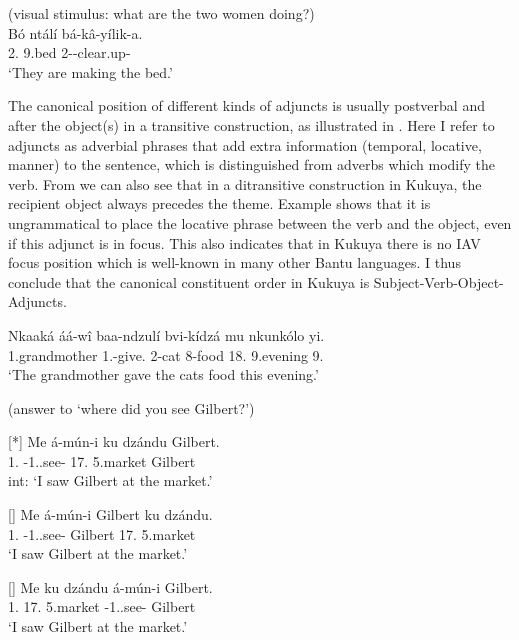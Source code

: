 \documentclass[output=paper,colorlinks,citecolor=brown,
]{langscibook}
\begin{document}
\begin{exe}
\ex
\label{2}
(visual stimulus: what are the two women doing?)\\
\gll
Bó ntálí bá-kâ-yílik-a.\\
2.\Pro{} 9.bed 2\Sm{}-\Prs{}-clear.up-\Fv{}\\
\trans ‘They are making the bed.’


\end{exe}
The canonical position of different kinds of adjuncts is usually postverbal and after the object(s) in a transitive construction, as illustrated in . Here I refer to adjuncts as adverbial phrases that add extra information (temporal, locative, manner) to the sentence, which is distinguished from adverbs which modify the verb. From  we can also see that in a ditransitive construction in Kukuya, the recipient object always precedes the theme. Example  shows that it is ungrammatical to place the locative phrase between the verb and the object, even if this adjunct is in focus. This also indicates that in Kukuya there is no IAV focus position which is well-known in many other Bantu languages. I thus conclude that the canonical constituent order in Kukuya is Subject-Verb-Object-Adjuncts.
\begin{exe}
\ex
\label{3}
\gll
Nkaaká áá-wî baa-ndzulí bvi-kídzá mu nkunkólo yi.\\
1.grandmother 1\Sm{}.\Pst{}-give.\Pst{} 2-cat 8-food 18.\Loc{} 9.evening 9.\Dem{}\\
\trans ‘The grandmother gave the cats food this evening.’

\end{exe}
\begin{exe} 
    \ex (answer to `where did you see Gilbert?') \label{4}
     \begin{xlist}
\ex
[*]{
\label{4a}
\gll
Me á-mún-i ku dzándu Gilbert.\\
1\Sg{}.\Pro{} \Pst{}-1\Sg{}.\Sm{}.see-\Pst{} 17.\Loc{} 5.market Gilbert\\
\trans int: ‘I saw Gilbert at the market.’
}

\ex
[]{
\label{4b}
\gll
Me á-mún-i Gilbert ku dzándu.\\
1\Sg{}.\Pro{} \Pst{}-1\Sg{}.\Sm{}.see-\Pst{} Gilbert 17.\Loc{} 5.market\\
\trans ‘I saw Gilbert at the market.’
}

\ex
[]{
\label{4c}
\gll
Me ku dzándu á-mún-i Gilbert.\\
1\Sg{}.\Pro{} 17.\Loc{} 5.market \Pst{}-1\Sg{}.\Sm{}.see-\Pst{} Gilbert\\
\trans ‘I saw Gilbert at the market.’
}

    \end{xlist}
\end{exe}
\end{document}
